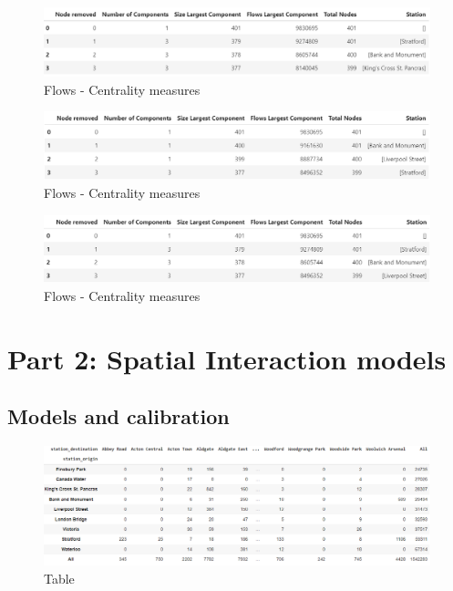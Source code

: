 \documentclass[10pt]{report}
\numberwithin{figure}{section}
\numberwithin{table}{section}
\begin{document}
    \begin{figure}[htp]
        \centering
        \includegraphics[width=14cm]{Image/Table_Flows_degree.png}
        \caption{Flows - Centrality measures}
        \label{fig:galaxy}
    \end{figure}

    \begin{figure}[htp]
        \centering
        \includegraphics[width=14cm]{Image/Table_Flows_eigenvector.png}
        \caption{Flows - Centrality measures}
        \label{fig:galaxy}
    \end{figure}


    \begin{figure}[htp]
        \centering
        \includegraphics[width=14cm]{Image/Table_Flows_Betweenness.png}
        \caption{Flows - Centrality measures}
        \label{fig:galaxy}
    \end{figure}

\newpage

\section{ Part 2: Spatial Interaction models}


\subsection{Models and calibration}







    \begin{figure}[htp]
        \centering
        \includegraphics[width=16cm]{Image/Part2_OD.png}
        \caption{Table}
        \label{fig:galaxy}
    \end{figure}
\end{document}
